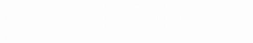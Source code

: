 \documentclass[a4paper, 11pt]{exam}
\begin{document}
\newpage
\textcolor{white}{spacing}
\newpage
\textcolor{white}{spacing}
\newpage
\textcolor{white}{spacing}
\newpage
\textcolor{white}{spacing}
\newpage
\textcolor{white}{spacing}
\newpage
\textcolor{white}{spacing}
\newpage
\textcolor{white}{spacing}
\newpage
\textcolor{white}{spacing}
\newpage
\textcolor{white}{spacing}
\newpage
\textcolor{white}{spacing}
\newpage
\textcolor{white}{spacing}
\newpage
\textcolor{white}{spacing}
\newpage
\textcolor{white}{spacing}
\newpage
\textcolor{white}{spacing}
\newpage
\textcolor{white}{spacing}
\newpage
\textcolor{white}{spacing}
\newpage
\textcolor{white}{spacing}
\newpage
\textcolor{white}{spacing}
\newpage
\textcolor{white}{spacing}
\newpage
\textcolor{white}{spacing}
\newpage
\textcolor{white}{spacing}
\newpage
\textcolor{white}{spacing}
\newpage
\textcolor{white}{spacing}
\newpage
\textcolor{white}{spacing}
\newpage
\textcolor{white}{spacing}
\newpage
\textcolor{white}{spacing}
\newpage
\textcolor{white}{spacing}
\newpage
\textcolor{white}{spacing}
\newpage
\textcolor{white}{spacing}
\newpage
\textcolor{white}{spacing}
\newpage
\textcolor{white}{spacing}
\newpage
\textcolor{white}{spacing}
\newpage
\textcolor{white}{spacing}
\newpage
\textcolor{white}{spacing}
\end{document}
